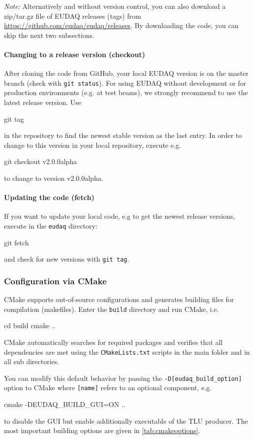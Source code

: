 \textit{Note:} Alternatively and without version control, you can also download a zip/tar.gz file of EUDAQ releases (tags) from \url{https://github.com/eudaq/eudaq/releases}. 
By downloading the code, you can skip the next two subsections. 

\paragraph{Changing to a release version (checkout)}
After cloning the code from GitHub, your local EUDAQ version is on the master branch (check with \texttt{git status}).  
For using EUDAQ without development or for production environments (e.g. at test beams), we strongly recommend to use the latest release version. 
Use 
\begin{listing}[mybash]
git tag 
\end{listing}
in the repository to find the newest stable version as the last entry.
In order to change to this version in your local repository, execute e.g. 
\begin{listing}[mybash]
git checkout v2.0.0alpha
\end{listing}
to change to version v2.0.0alpha.

\paragraph{Updating the code (fetch)}
If you want to update your local code, e.g to get the newest release versions, execute in the \texttt{eudaq} directory: 
\begin{listing}[mybash]
git fetch
\end{listing}
and check for new versions with \texttt{git tag}. 


\subsubsection{Configuration via CMake}
\label{sec:cmake}
CMake supports out-of-source configurations and generates building files for compilation (makefiles). 
Enter the \texttt{build} directory and run CMake, i.e.
\begin{listing}[mybash]
cd build
cmake ..
\end{listing}
CMake automatically searches for required packages and verifies that all dependencies are met using the \texttt{CMakeLists.txt} scripts in the main folder and in all sub directories. 

You can modify this default behavior by passing the \texttt{-D[eudaq\_build\_option]} option to
CMake where \texttt{[name]} refers to an optional component, e.g.
\begin{listing}[mybash]
cmake -DEUDAQ_BUILD_GUI=ON  ..
\end{listing}
to disable the GUI but enable additionally executable of the TLU producer.
The most important building options are given in \autoref{tab:cmakeoptions}.

